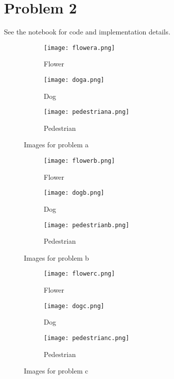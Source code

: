 \documentclass[10pt,a4paper]{article}
\begin{document}
\clearpage

\section*{Problem 2}

See the notebook for code and implementation details.

\begin{figure}[!htb]
    \centering
    \begin{subfigure}[t]{0.33\textwidth}
        \centering
        \texttt{[image: flowera.png]}
        \caption{Flower}
    \end{subfigure}%
    \bigskip
     \centering
    \begin{subfigure}[t]{0.33\textwidth}
        \centering
        \texttt{[image: doga.png]}
        \caption{Dog}
    \end{subfigure}%
    \bigskip
    \begin{subfigure}[t]{0.33\textwidth}
        \centering
        \texttt{[image: pedestriana.png]}
        \caption{Pedestrian}
    \end{subfigure}
    \caption{Images for problem a}
\end{figure}

\begin{figure}[!htb]
    \centering
    \begin{subfigure}[t]{0.33\textwidth}
        \centering
        \texttt{[image: flowerb.png]}
        \caption{Flower}
    \end{subfigure}%
    \bigskip
     \centering
    \begin{subfigure}[t]{0.33\textwidth}
        \centering
        \texttt{[image: dogb.png]}
        \caption{Dog}
    \end{subfigure}%
    \bigskip
    \begin{subfigure}[t]{0.33\textwidth}
        \centering
        \texttt{[image: pedestrianb.png]}
        \caption{Pedestrian}
    \end{subfigure}
    \caption{Images for problem b}
\end{figure}

\begin{figure}[!htb]
    \centering
    \begin{subfigure}[t]{0.33\textwidth}
        \centering
        \texttt{[image: flowerc.png]}
        \caption{Flower}
    \end{subfigure}%
    \bigskip
     \centering
    \begin{subfigure}[t]{0.33\textwidth}
        \centering
        \texttt{[image: dogc.png]}
        \caption{Dog}
    \end{subfigure}%
    \bigskip
    \begin{subfigure}[t]{0.33\textwidth}
        \centering
        \texttt{[image: pedestrianc.png]}
        \caption{Pedestrian}
    \end{subfigure}
    \caption{Images for problem c}
\end{figure}
\end{document}
